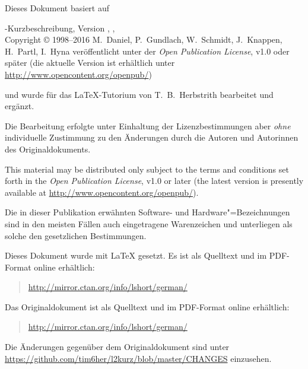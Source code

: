 {\parindent=0cm\thispagestyle{empty}

Dieses Dokument basiert auf
\bigskip

\sbLaTeXe-Kurzbeschreibung, Version \lkver, \lkdate,\\
Copyright \copyright{} 1998--2016 M.~Daniel, P.~Gundlach, W.~Schmidt, J.~Knappen, H.~Partl, I.~Hyna veröffentlicht unter der \emph{Open Publication License}, v1.0 oder später (die aktuelle Version ist erhältlich unter
\url{http://www.opencontent.org/openpub/})
\bigskip

und wurde für das \LaTeX-Tutorium von T.~B.~Herbstrith bearbeitet und ergänzt.

Die Bearbeitung erfolgte unter Einhaltung der Lizenzbestimmungen aber \emph{ohne} individuelle Zustimmung zu den Änderungen durch die Autoren und Autorinnen des Originaldokuments.
\bigskip

{
This material may be distributed only subject to the terms and
conditions set forth in the \emph{Open Publication License}, v1.0 or
later (the latest version is presently available at
\url{http://www.opencontent.org/openpub/}).}


\bigskip

Die in dieser Publikation erwähnten Software- und Hardware"=Bezeichnungen sind
in den meisten Fällen auch eingetragene Warenzeichen und unterliegen als
solche den gesetzlichen Bestimmungen.

\bigskip

\vfill

Dieses Dokument wurde mit \LaTeX{} gesetzt.
Es ist als Quelltext und im PDF-Format online erhältlich:
\begin{quote}
\url{http://mirror.ctan.org/info/lshort/german/}
\end{quote}

\bigskip

Das Originaldokument ist als Quelltext und im PDF-Format online erhältlich:
\begin{quote}
\url{http://mirror.ctan.org/info/lshort/german/}
\end{quote}
Die Änderungen gegenüber dem Originaldokument sind unter \url{https://github.com/tim6her/l2kurz/blob/master/CHANGES} einzusehen.

}
